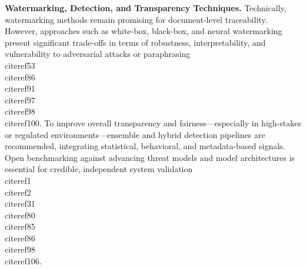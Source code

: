 \documentclass[11pt]{article}
\begin{document}
\textbf{Watermarking, Detection, and Transparency Techniques.}  
Technically, watermarking methods remain promising for document-level traceability. However, approaches such as white-box, black-box, and neural watermarking present significant trade-offs in terms of robustness, interpretability, and vulnerability to adversarial attacks or paraphrasing \\cite{ref53}\\cite{ref86}\\cite{ref91}\\cite{ref97}\\cite{ref98}\\cite{ref100}. To improve overall transparency and fairness—especially in high-stakes or regulated environments—ensemble and hybrid detection pipelines are recommended, integrating statistical, behavioral, and metadata-based signals. Open benchmarking against advancing threat models and model architectures is essential for credible, independent system validation \\cite{ref1}\\cite{ref2}\\cite{ref31}\\cite{ref80}\\cite{ref85}\\cite{ref86}\\cite{ref98}\\cite{ref106}.
\end{document}
